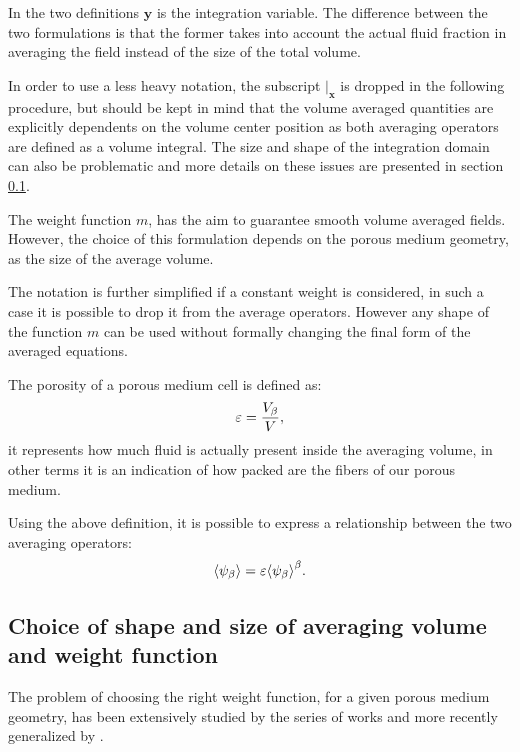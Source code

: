 In the two definitions $\mathbf{y}$ is the integration variable.
The difference between the two formulations is that the former takes into account the actual fluid fraction in averaging the field instead of the size of the total volume.

In order to use a less heavy notation, the subscript $|_{\mathbf{x}}$ is dropped in the following procedure, but should be kept in mind that the volume averaged quantities are explicitly dependents on the volume center position as both averaging operators are defined as a volume integral.
The size and shape of the integration domain can also be problematic and more details on these issues are presented in section \ref{ch:filter}.

The weight function $m$, has the aim to guarantee smooth volume averaged fields.
However, the choice of this formulation depends on the porous medium geometry, as the size of the average volume.

The notation is further simplified if a constant weight is considered, in such a case it is possible to drop it from the average operators.
However any shape of the function $m$ can be used without formally changing the final form of the averaged equations.

The porosity of a porous medium cell is defined as:
\begin{equation}
	\varepsilon = \dfrac{V_\beta}{V},
	\label{eq:porosity}
\end{equation}
it represents how much fluid is actually present inside the averaging volume, in other terms it is an indication of how packed are the fibers of our porous medium.

Using the above definition, it is possible to express a relationship between the two averaging operators:
\begin{equation}
	{\left< \psi_{\beta} \right>} =  \varepsilon {\left< \psi_{\beta} \right>}^{\beta}.
	\label{eq:means_vs_meani}
\end{equation}

\subsection{Choice of shape and size of averaging volume and weight function}
\label{ch:filter}

The problem of choosing the right weight function, for a given porous medium geometry, has been extensively studied by the series of works \citet{quintard1994transport1} \cite{quintard1994transport2} \cite{quintard1994transport3} \cite{quintard1994transport4} \cite{quintard1994transport5} and more recently generalized by \citet{davit2017technical}.

